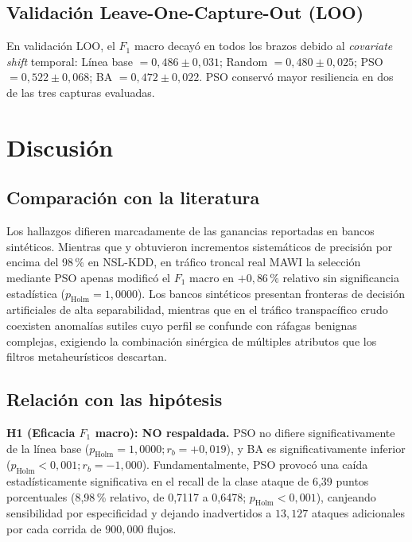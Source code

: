 \documentclass[11pt,a4paper]{article}
\begin{document}
\subsection{Validación Leave-One-Capture-Out (LOO)}
En validación LOO, el $F_1$ macro decayó en todos los brazos debido al \emph{covariate shift} temporal: Línea base $= 0{,}486 \pm 0{,}031$; Random $= 0{,}480 \pm 0{,}025$; PSO $= 0{,}522 \pm 0{,}068$; BA $= 0{,}472 \pm 0{,}022$. PSO conservó mayor resiliencia en dos de las tres capturas evaluadas.

\section{Discusión}

\subsection{Comparación con la literatura}
Los hallazgos difieren marcadamente de las ganancias reportadas en bancos sintéticos. Mientras que \textcite{safa2024} y \textcite{ghanem2022} obtuvieron incrementos sistemáticos de precisión por encima del 98\,\% en NSL-KDD, en tráfico troncal real MAWI la selección mediante PSO apenas modificó el $F_1$ macro en $+0{,}86\,\%$ relativo sin significancia estadística ($p_{\text{Holm}} = 1{,}0000$). Los bancos sintéticos presentan fronteras de decisión artificiales de alta separabilidad, mientras que en el tráfico transpacífico crudo coexisten anomalías sutiles cuyo perfil se confunde con ráfagas benignas complejas, exigiendo la combinación sinérgica de múltiples atributos que los filtros metaheurísticos descartan.

\subsection{Relación con las hipótesis}
\textbf{H1 (Eficacia $F_1$ macro): NO respaldada.} PSO no difiere significativamente de la línea base ($p_{\text{Holm}} = 1{,}0000; r_b = +0{,}019$), y BA es significativamente inferior ($p_{\text{Holm}} < 0{,}001; r_b = -1{,}000$). Fundamentalmente, PSO provocó una caída estadísticamente significativa en el recall de la clase ataque de 6,39 puntos porcentuales (8,98\,\% relativo, de 0,7117 a 0,6478; $p_{\text{Holm}} < 0{,}001$), canjeando sensibilidad por especificidad y dejando inadvertidos a $13{,}127$ ataques adicionales por cada corrida de $900{,}000$ flujos.
\end{document}
